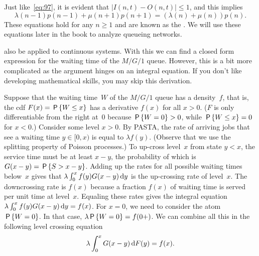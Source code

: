 \documentclass[stochastic-or.tex]{subfiles}
\begin{document}
Just like~\cref{eq:97}, it is evident that $|I(n,t)-O(n,t)|\leq 1$, and this implies
\begin{equation}\label{eq:104}
 \lambda(n-1)p(n-1)+\mu(n+1)p(n+1) = (\lambda(n)+\mu(n))p(n).
\end{equation}
These equations hold for any $n\geq 1$ and are known as the .
We will use these equations later in the book to analyze queueing networks.


 also be applied to continuous systems.
With this we can find a closed form expression for the waiting time of the $M/G/1$ queue.
However, this is a bit more complicated as the argument hinges on an integral equation.
If you don't like developing mathematical skills, you may skip this derivation.

Suppose that the waiting time~$W$ of the $M/G/1$ queue has a density~$f$, that is, the cdf $F(x) = \P{W\leq x}$ has a derivative $f(x)$ for all $x>0$.
($F$ is only differentiable from the right at~$0$ because $\P{W=0}>0$, while $\P{W\leq x} = 0$ for $x<0$.)
Consider some level $x>0$.
By PASTA, the rate of arriving jobs that see a waiting time $y \in [0, x)$ is equal to $\lambda f(y)$. (Observe that we use the splitting property of Poisson processes.)
To up-cross level~$x$ from state $y< x$, the service time must be at least $x-y$, the probability of which is $G(x-y) = \P{S>x-y}$.
Adding up the rates for all possible waiting times below~$x$ gives that $\lambda\int_0^x f(y) G(x-y)\d y$ is the up-crossing rate of level~$x$.
The downcrossing rate is $f(x)$ because a fraction $f(x)$ of waiting time is served per unit time at level~$x$.
Equaling these rates gives the integral equation $\lambda \int_0^{x} f(y) G(x-y)\d y = f(x)$.
For $x=0$, we need to consider the atom $\P{W=0}$.
In that case, $\lambda \P{W=0} = f(0+)$.
We can combine all this in the following level crossing equation
\begin{equation*}
\lambda\int_0^x G(x-y) \d F(y) = f(x).
\end{equation*}
\end{document}
